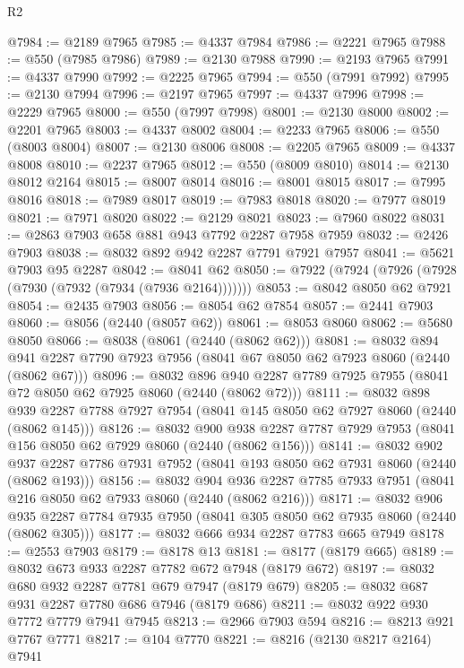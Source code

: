 \begin{lexlean}{R2}
\begin{coremodule}
@7984 := @2189 @7965
@7985 := @4337 @7984
@7986 := @2221 @7965
@7988 := @550 (@7985 @7986)
@7989 := @2130 @7988
@7990 := @2193 @7965
@7991 := @4337 @7990
@7992 := @2225 @7965
@7994 := @550 (@7991 @7992)
@7995 := @2130 @7994
@7996 := @2197 @7965
@7997 := @4337 @7996
@7998 := @2229 @7965
@8000 := @550 (@7997 @7998)
@8001 := @2130 @8000
@8002 := @2201 @7965
@8003 := @4337 @8002
@8004 := @2233 @7965
@8006 := @550 (@8003 @8004)
@8007 := @2130 @8006
@8008 := @2205 @7965
@8009 := @4337 @8008
@8010 := @2237 @7965
@8012 := @550 (@8009 @8010)
@8014 := @2130 @8012 @2164
@8015 := @8007 @8014
@8016 := @8001 @8015
@8017 := @7995 @8016
@8018 := @7989 @8017
@8019 := @7983 @8018
@8020 := @7977 @8019
@8021 := @7971 @8020
@8022 := @2129 @8021
@8023 := @7960 @8022
@8031 := @2863 @7903 @658 @881 @943 @7792 @2287 @7958 @7959
@8032 := @2426 @7903
@8038 := @8032 @892 @942 @2287 @7791 @7921 @7957
@8041 := @5621 @7903 @95 @2287
@8042 := @8041 @62
@8050 := @7922 (@7924 (@7926 (@7928 (@7930 (@7932 (@7934 (@7936 @2164)))))))
@8053 := @8042 @8050 @62 @7921
@8054 := @2435 @7903
@8056 := @8054 @62 @7854
@8057 := @2441 @7903
@8060 := @8056 (@2440 (@8057 @62))
@8061 := @8053 @8060
@8062 := @5680 @8050
@8066 := @8038 (@8061 (@2440 (@8062 @62)))
@8081 := @8032
    @894
    @941
    @2287
    @7790
    @7923
    @7956
    (@8041 @67 @8050 @62 @7923 @8060 (@2440 (@8062 @67)))
@8096 := @8032
    @896
    @940
    @2287
    @7789
    @7925
    @7955
    (@8041 @72 @8050 @62 @7925 @8060 (@2440 (@8062 @72)))
@8111 := @8032
    @898
    @939
    @2287
    @7788
    @7927
    @7954
    (@8041 @145 @8050 @62 @7927 @8060 (@2440 (@8062 @145)))
@8126 := @8032
    @900
    @938
    @2287
    @7787
    @7929
    @7953
    (@8041 @156 @8050 @62 @7929 @8060 (@2440 (@8062 @156)))
@8141 := @8032
    @902
    @937
    @2287
    @7786
    @7931
    @7952
    (@8041 @193 @8050 @62 @7931 @8060 (@2440 (@8062 @193)))
@8156 := @8032
    @904
    @936
    @2287
    @7785
    @7933
    @7951
    (@8041 @216 @8050 @62 @7933 @8060 (@2440 (@8062 @216)))
@8171 := @8032
    @906
    @935
    @2287
    @7784
    @7935
    @7950
    (@8041 @305 @8050 @62 @7935 @8060 (@2440 (@8062 @305)))
@8177 := @8032 @666 @934 @2287 @7783 @665 @7949
@8178 := @2553 @7903
@8179 := @8178 @13
@8181 := @8177 (@8179 @665)
@8189 := @8032 @673 @933 @2287 @7782 @672 @7948 (@8179 @672)
@8197 := @8032 @680 @932 @2287 @7781 @679 @7947 (@8179 @679)
@8205 := @8032 @687 @931 @2287 @7780 @686 @7946 (@8179 @686)
@8211 := @8032 @922 @930 @7772 @7779 @7941 @7945
@8213 := @2966 @7903 @594
@8216 := @8213 @921 @7767 @7771
@8217 := @104 @7770
@8221 := @8216 (@2130 @8217 @2164) @7941

\end{coremodule}
\end{lexlean}
